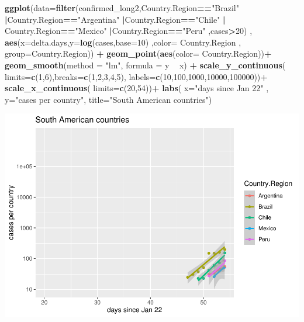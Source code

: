 \documentclass[]{article}
\newenvironment{Shaded}{\begin{snugshade}}{\end{snugshade}}
\newcommand{\DataTypeTok}[1]{\textcolor[rgb]{0.13,0.29,0.53}{#1}}
\newcommand{\DecValTok}[1]{\textcolor[rgb]{0.00,0.00,0.81}{#1}}
\newcommand{\KeywordTok}[1]{\textcolor[rgb]{0.13,0.29,0.53}{\textbf{#1}}}
\newcommand{\NormalTok}[1]{#1}
\newcommand{\OperatorTok}[1]{\textcolor[rgb]{0.81,0.36,0.00}{\textbf{#1}}}
\newcommand{\StringTok}[1]{\textcolor[rgb]{0.31,0.60,0.02}{#1}}
\begin{document}
\begin{Shaded}
\begin{Highlighting}[]
\KeywordTok{ggplot}\NormalTok{(}\DataTypeTok{data=}\KeywordTok{filter}\NormalTok{(confirmed_long2,Country.Region}\OperatorTok{==}\StringTok{"Brazil"} \OperatorTok{|}\NormalTok{Country.Region}\OperatorTok{==}\StringTok{"Argentina"} \OperatorTok{|}\NormalTok{Country.Region}\OperatorTok{==}\StringTok{"Chile"} \OperatorTok{|}\StringTok{ }\NormalTok{Country.Region}\OperatorTok{==}\StringTok{"Mexico"} \OperatorTok{|}\NormalTok{Country.Region}\OperatorTok{==}\StringTok{"Peru"}\NormalTok{    ,cases}\OperatorTok{>}\DecValTok{20}\NormalTok{) , }\KeywordTok{aes}\NormalTok{(}\DataTypeTok{x=}\NormalTok{delta.days,}\DataTypeTok{y=}\KeywordTok{log}\NormalTok{(cases,}\DataTypeTok{base=}\DecValTok{10}\NormalTok{) ,}\DataTypeTok{color=}\NormalTok{ Country.Region , }\DataTypeTok{group=}\NormalTok{Country.Region)) }\OperatorTok{+}
\StringTok{  }\KeywordTok{geom_point}\NormalTok{(}\KeywordTok{aes}\NormalTok{(}\DataTypeTok{color=}\NormalTok{ Country.Region))}\OperatorTok{+}
\StringTok{    }\KeywordTok{geom_smooth}\NormalTok{(}\DataTypeTok{method =} \StringTok{"lm"}\NormalTok{, }\DataTypeTok{formula =}\NormalTok{ y }\OperatorTok{~}\StringTok{ }\NormalTok{x) }\OperatorTok{+}\StringTok{ }
\StringTok{  }\KeywordTok{scale_y_continuous}\NormalTok{( }\DataTypeTok{limits=}\KeywordTok{c}\NormalTok{(}\DecValTok{1}\NormalTok{,}\DecValTok{6}\NormalTok{),}\DataTypeTok{breaks=}\KeywordTok{c}\NormalTok{(}\DecValTok{1}\NormalTok{,}\DecValTok{2}\NormalTok{,}\DecValTok{3}\NormalTok{,}\DecValTok{4}\NormalTok{,}\DecValTok{5}\NormalTok{), }\DataTypeTok{labels=}\KeywordTok{c}\NormalTok{(}\DecValTok{10}\NormalTok{,}\DecValTok{100}\NormalTok{,}\DecValTok{1000}\NormalTok{,}\DecValTok{10000}\NormalTok{,}\DecValTok{100000}\NormalTok{))}\OperatorTok{+}
\StringTok{  }\KeywordTok{scale_x_continuous}\NormalTok{( }\DataTypeTok{limits=}\KeywordTok{c}\NormalTok{(}\DecValTok{20}\NormalTok{,}\DecValTok{54}\NormalTok{))}\OperatorTok{+}
\StringTok{  }\KeywordTok{labs}\NormalTok{( }\DataTypeTok{x=}\StringTok{"days since Jan 22"}\NormalTok{ , }\DataTypeTok{y=}\StringTok{"cases per country"}\NormalTok{, }\DataTypeTok{title=}\StringTok{"South American countries"}\NormalTok{)}
\end{Highlighting}
\end{Shaded}

\includegraphics{PlotData_files/figure-latex/plotSACountries-1.pdf}
\end{document}

